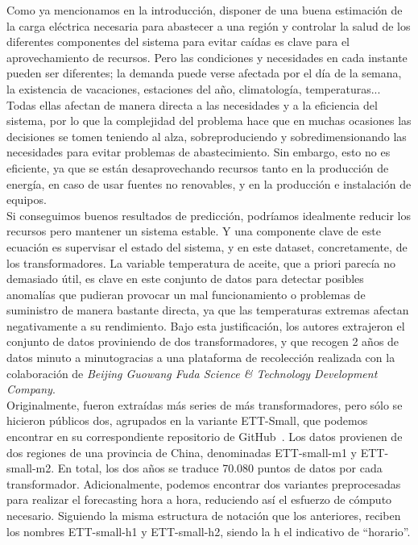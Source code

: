 Como ya mencionamos en la introducción, disponer de una buena estimación de la carga eléctrica necesaria para abastecer a una región y controlar la salud de los diferentes componentes del sistema para evitar caídas es clave para el aprovechamiento de recursos. Pero las condiciones y necesidades en cada instante pueden ser diferentes; la demanda puede verse afectada por el día de la semana, la existencia de vacaciones, estaciones del año, climatología, temperaturas... Todas ellas afectan de manera directa a las necesidades y a la eficiencia del sistema, por lo que la complejidad del problema hace que en muchas ocasiones las decisiones se tomen teniendo al alza, sobreproduciendo y sobredimensionando las necesidades para evitar problemas de abastecimiento. Sin embargo, esto no es eficiente, ya que se están desaprovechando recursos tanto en la producción de energía, en caso de usar fuentes no renovables, y en la producción e instalación de equipos.\\

Si conseguimos buenos resultados de predicción, podríamos idealmente reducir los recursos pero mantener un sistema estable. Y una componente clave de este ecuación es supervisar el estado del sistema, y en este dataset, concretamente, de los transformadores. La variable temperatura de aceite, que a priori parecía no demasiado útil, es clave en este conjunto de datos para detectar posibles anomalías que pudieran provocar un mal funcionamiento o problemas de suministro de manera bastante directa, ya que las temperaturas extremas afectan negativamente a su rendimiento. Bajo esta justificación, los autores extrajeron el conjunto de datos proviniendo de dos transformadores, y que recogen 2 años de datos minuto a minutogracias a una plataforma de recolección realizada con la colaboración de \textit{Beijing Guowang Fuda Science \& Technology Development Company}.\\

Originalmente, fueron extraídas más series de más transformadores, pero sólo se hicieron públicos dos, agrupados en la variante ETT-Small, que podemos encontrar en su correspondiente repositorio de GitHub~\cite{zhou2021etdataset}. Los datos provienen de dos regiones de una provincia de China, denominadas ETT-small-m1 y ETT-small-m2. En total, los dos años se traduce 70.080 puntos de datos por cada transformador. Adicionalmente, podemos encontrar dos variantes preprocesadas para realizar el forecasting hora a hora, reduciendo así el esfuerzo de cómputo necesario. Siguiendo la misma estructura de notación que los anteriores, reciben los nombres ETT-small-h1 y ETT-small-h2, siendo la h el indicativo de ``horario''.\\

